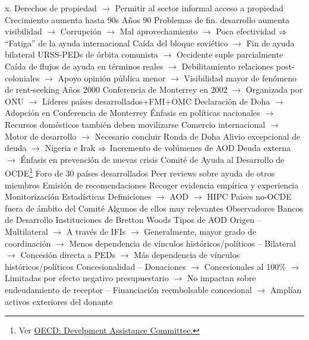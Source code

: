\documentclass{nuevotema}
\begin{document}
\begin{esquemal}
				\4[] x. Derechos de propiedad
				\4[] $\to$ Permitir al sector informal acceso a propiedad
				\4[] Crecimiento aumenta hasta 90s
				\4 Años 90
				\4[] Problemas de fin. desarrollo aumenta visibilidad
				\4[] $\to$ Corrupción
				\4[] $\to$ Mal aprovechamiento
				\4[] $\to$ Poca efectividad
				\4[] $\Rightarrow$ ``Fatiga'' de la ayuda internacional
				\4[] Caída del bloque soviético
				\4[] $\to$ Fin de ayuda bilateral URSS-PEDs de órbita comunista
				\4[] $\to$ Occidente suple parcialmente
				\4[] Caída de flujos de ayuda en términos reales
				\4[] $\to$ Debilitamiento relaciones post-coloniales
				\4[] $\to$ Apoyo opinión pública menor
				\4[] $\to$ Visibilidad mayor de fenómeno de rent-seeking
				\4 Años 2000
				\4[] Conferencia de Monterrey en 2002
				\4[] $\to$ Organizada por ONU
				\4[] $\to$ Líderes países desarrollados+FMI+OMC
				\4[] Declaración de Doha
				\4[] $\to$ Adopción en Conferencia de Monterrey
				\4[] Énfasis en políticas nacionales
				\4[] $\to$ Recursos domésticos también deben movilizarse
				\4[] Comercio internacional
				\4[] $\to$ Motor de desarrollo
				\4[] $\to$ Necesario concluir Ronda de Doha
				\4[] Alivio excepcional de deuda
				\4[] $\to$ Nigeria e Irak
				\4[] $\Rightarrow$ Incremento de volúmenes de AOD
				\4[] Deuda externa
				\4[] $\to$ Énfasis en prevención de nuevas crisis
			\3 Comité de Ayuda al Desarrollo de OCDE\footnote{Ver \href{https://www.oecd.org/dac/development-assistance-committee/}{OECD: Develpment Assistance Committee.}}
				\4 Foro de 30 países desarrollados
				\4 Peer reviews sobre ayuda de otros miembros
				\4 Emisión de recomendaciones
				\4[] Recoger evidencia empírica y experiencia
				\4 Monitorización
				\4[] Estadísticas
				\4[] Definiciones
				\4[] $\to$ AOD
				\4[] $\to$ HIPC
				\4 Países no-OCDE fuera de ámbito del Comité
				\4[] Algunos de ellos muy relevantes
				\4 Observadores
				\4[] Bancos de Desarrollo
				\4[] Instituciones de Bretton Woods
			\3 Tipos de AOD
				\4 Origen
				\4[] -- Multilateral
				\4[] $\to$ A través de IFIs
				\4[] $\to$ Generalmente, mayor grado de coordinación
				\4[] $\to$ Menos dependencia de vínculos históricos/políticos
				\4[] -- Bilateral
				\4[] $\to$ Concesión directa a PEDs
				\4[] $\to$ Más dependencia de vínculos históricos/políticos
				\4 Concesionalidad
				\4[] -- Donaciones
				\4[] $\to$ Concesionales al 100\%
				\4[] $\to$ Limitadas por efecto negativo presupuestario
				\4[] $\to$ No impactan sobre endeudamiento de receptor
				\4[] -- Financiación reembolsable concesional
				\4[] $\to$ Amplían activos exteriores del donante

\end{esquemal}
\end{document}
